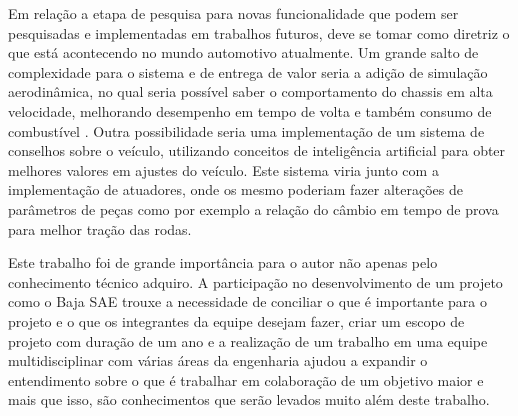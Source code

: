 Em relação a etapa de pesquisa para novas funcionalidade que podem ser pesquisadas e implementadas em trabalhos futuros, deve se tomar como diretriz o que está acontecendo no mundo automotivo atualmente. Um grande salto de complexidade para o sistema e de entrega de valor seria a adição de simulação aerodinâmica, no qual seria possível saber o comportamento do chassis em alta velocidade, melhorando desempenho em tempo de volta e também consumo de combustível \cite{wang2018aerodynamic}. Outra possibilidade seria uma implementação de um sistema de conselhos sobre o veículo, utilizando conceitos de inteligência artificial para obter melhores valores em ajustes do veículo. Este sistema viria junto com a implementação de atuadores, onde os mesmo poderiam fazer alterações de parâmetros de peças como por exemplo a relação do câmbio em tempo de prova para melhor tração das rodas.   

Este trabalho foi de grande importância para o autor não apenas pelo conhecimento técnico adquiro. A participação no desenvolvimento de um projeto como o Baja SAE trouxe a necessidade de conciliar o que é importante para o projeto e o que os integrantes da equipe desejam fazer, criar um escopo de projeto com duração de um ano e a realização de um trabalho em uma equipe multidisciplinar com várias áreas da engenharia ajudou a expandir o entendimento sobre o que é trabalhar em colaboração de um objetivo maior e mais que isso, são conhecimentos que serão levados muito além deste trabalho.   